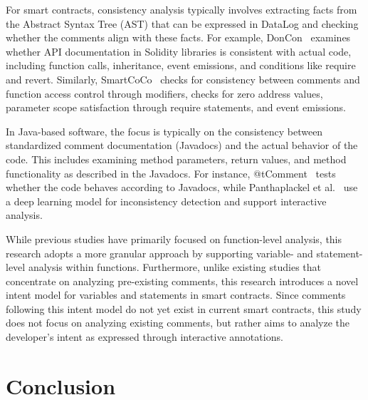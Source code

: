 \documentclass[10pt, conference]{IEEEtran}
\begin{document}
        For smart contracts, consistency analysis typically involves extracting facts from the Abstract Syntax Tree (AST) that can be expressed in DataLog and checking whether the comments align with these facts. For example, DonCon~\cite{solapi} examines whether API documentation in Solidity libraries is consistent with actual code, including function calls, inheritance, event emissions, and conditions like require and revert. Similarly, SmartCoCo~\cite{coco} checks for consistency between comments and function access control through modifiers, checks for zero address values, parameter scope satisfaction through require statements, and event emissions.

        In Java-based software, the focus is typically on the consistency between standardized comment documentation (Javadocs) and the actual behavior of the code. This includes examining method parameters, return values, and method functionality as described in the Javadocs. For instance, @tComment~\cite{tcomment} tests whether the code behaves according to Javadocs, while Panthaplackel et al.~\cite{deep} use a deep learning model for inconsistency detection and support interactive analysis.

        While previous studies have primarily focused on function-level analysis, this research adopts a more granular approach by supporting variable- and statement-level analysis within functions. Furthermore, unlike existing studies that concentrate on analyzing pre-existing comments, this research introduces a novel intent model for variables and statements in smart contracts. Since comments following this intent model do not yet exist in current smart contracts, this study does not focus on analyzing existing comments, but rather aims to analyze the developer’s intent as expressed through interactive annotations.

\section{Conclusion}


\newif\ifshowack          %
\showackfalse             %

\ifshowack
  \section*{Acknowledgment}  
\fi
\end{document}
